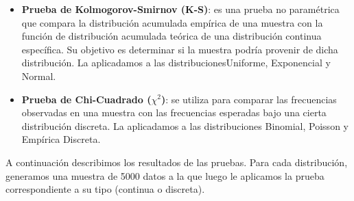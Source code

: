 \documentclass{article}
\begin{document}
\begin{itemize}
    \item \textbf{Prueba de Kolmogorov-Smirnov (K-S)}: es una prueba no paramétrica que compara la distribución acumulada empírica de una muestra con la función de distribución acumulada teórica de una distribución continua específica. Su objetivo es determinar si la muestra podría provenir de dicha distribución. La aplicadamos a las distribucionesUniforme, Exponencial y Normal.
    \item \textbf{Prueba de Chi-Cuadrado ($\chi^2$)}: se utiliza para comparar las frecuencias observadas en una muestra con las frecuencias esperadas bajo una cierta distribución discreta. La aplicadamos a las distribuciones Binomial, Poisson y Empírica Discreta.
\end{itemize}

A continuación describimos los resultados de las pruebas. Para cada distribución, generamos una muestra de 5000 datos a la que luego le aplicamos la prueba correspondiente a su tipo (continua o discreta).
\end{document}
